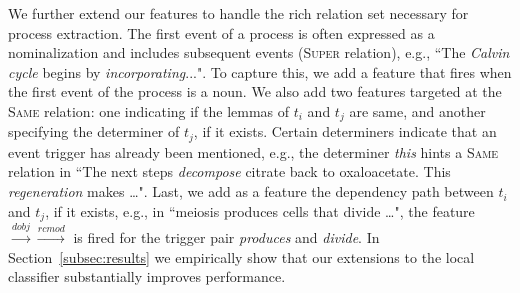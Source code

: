 
We further extend our features to handle the rich relation set necessary for process extraction. The first event of a process is often expressed as a nominalization and includes subsequent events (\textsc{Super} relation), e.g., ``The \emph{Calvin cycle} begins by \emph{incorporating}...". To capture this, we add a feature that fires when the first event of the process is a noun. We also add two features targeted at the \textsc{Same} relation: one indicating if the lemmas of $t_i$ and $t_j$ are same, and another specifying the determiner of $t_j$, if it exists. Certain determiners indicate that an event trigger has already been mentioned, e.g., the determiner \emph{this} hints a \textsc{Same} relation in ``The next steps \emph{decompose} citrate back to oxaloacetate. This \emph{regeneration} makes \ldots". Last, we add as a feature the dependency path between $t_i$ and $t_j$, if it exists, e.g., in ``meiosis produces cells that divide \ldots", the feature $\xrightarrow{\scriptscriptstyle dobj} \xrightarrow{\scriptscriptstyle rcmod}$ is fired for the trigger pair \emph{produces} and \emph{divide}. In Section~\ref{subsec:results} we empirically show that our extensions to the local classifier substantially improves performance.


